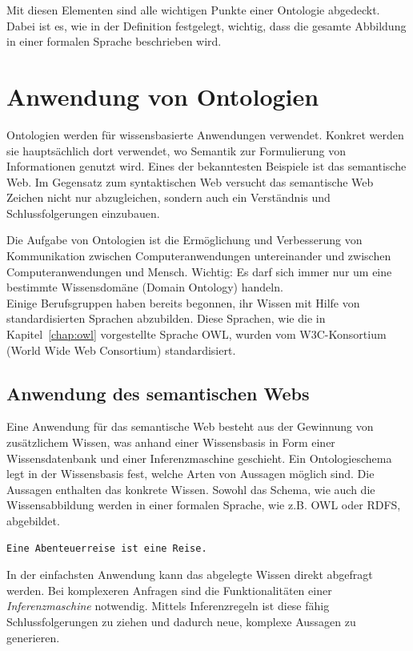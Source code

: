 Mit diesen Elementen sind alle wichtigen Punkte einer Ontologie abgedeckt. Dabei ist es, wie in der Definition festgelegt, wichtig, dass die gesamte Abbildung in einer formalen Sprache beschrieben wird.

\section{Anwendung von Ontologien}
\label{sec:ontologien_onto_anwendung}
Ontologien werden für wissensbasierte Anwendungen verwendet. Konkret werden sie hauptsächlich dort verwendet, wo Semantik zur Formulierung von Informationen genutzt wird. Eines der bekanntesten Beispiele ist das semantische Web. Im Gegensatz zum syntaktischen Web versucht das semantische Web Zeichen nicht nur abzugleichen, sondern auch ein Verständnis und Schlussfolgerungen einzubauen.

Die Aufgabe von Ontologien ist die Ermöglichung und Verbesserung von Kommunikation zwischen Computeranwendungen untereinander und zwischen Computeranwendungen und Mensch. Wichtig: Es darf sich immer nur um eine bestimmte Wissensdomäne (Domain Ontology) handeln.\\
Einige Berufsgruppen haben bereits begonnen, ihr Wissen mit Hilfe von standardisierten Sprachen abzubilden. Diese Sprachen, wie die in Kapitel~\ref{chap:owl} vorgestellte Sprache OWL, wurden vom W3C-Konsortium (World Wide Web Consortium) standardisiert.

\subsection{Anwendung des semantischen Webs}
\label{subsec:ontologien_onto_SemantikWebAnwendung}
Eine Anwendung für das semantische Web besteht aus der Gewinnung von zusätzlichem Wissen, was anhand einer Wissensbasis in Form einer Wissensdatenbank und einer Inferenzmaschine geschieht. Ein Ontologieschema legt in der Wissensbasis fest, welche Arten von Aussagen möglich sind. Die Aussagen enthalten das konkrete Wissen. Sowohl das Schema, wie auch die Wissensabbildung werden in einer formalen Sprache, wie z.B. OWL oder RDFS, abgebildet.

\begin{lstlisting}[caption={Beispiel einer Aussage in einer Wissensbasis.}]
Eine Abenteuerreise ist eine Reise.
\end{lstlisting}

In der einfachsten Anwendung kann das abgelegte Wissen direkt abgefragt werden. Bei komplexeren Anfragen sind die Funktionalitäten einer \textit{Inferenzmaschine} notwendig. Mittels Inferenzregeln ist diese fähig Schlussfolgerungen zu ziehen und dadurch neue, komplexe Aussagen zu generieren.

